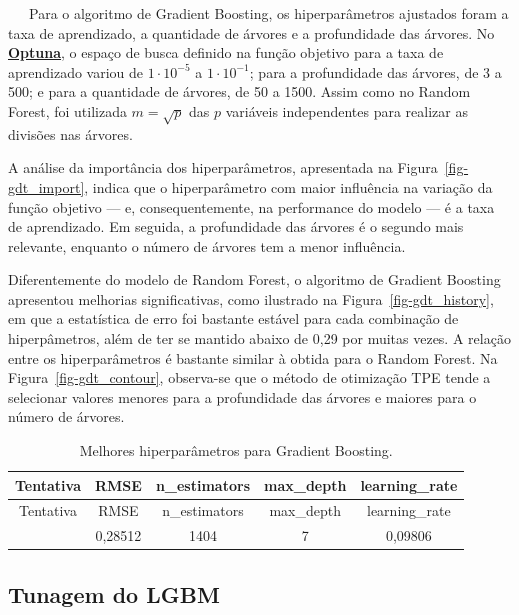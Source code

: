 \documentclass[
  12pt,
  a4paper,
]{scrreprt}
\begin{document}
~~~Para o algoritmo de Gradient Boosting, os hiperparâmetros ajustados
foram a taxa de aprendizado, a quantidade de árvores e a profundidade
das árvores. No \href{https://optuna.org/}{\textbf{Optuna}}, o espaço de
busca definido na função objetivo para a taxa de aprendizado variou de
\(1 \cdot 10^{-5}\) a \(1 \cdot 10^{-1}\); para a profundidade das
árvores, de 3 a 500; e para a quantidade de árvores, de 50 a 1500. Assim
como no Random Forest, foi utilizada \(m = \sqrt{p}\)\hspace{0pt} das
\(p\) variáveis independentes para realizar as divisões nas árvores.

\vspace{12pt}

A análise da importância dos hiperparâmetros, apresentada na
Figura~\ref{fig-gdt_import}, indica que o hiperparâmetro com maior
influência na variação da função objetivo --- e, consequentemente, na
performance do modelo --- é a taxa de aprendizado. Em seguida, a
profundidade das árvores é o segundo mais relevante, enquanto o número
de árvores tem a menor influência.

\vspace{12pt}

Diferentemente do modelo de Random Forest, o algoritmo de Gradient
Boosting apresentou melhorias significativas, como ilustrado na
Figura~\ref{fig-gdt_history}, em que a estatística de erro foi bastante
estável para cada combinação de hiperpâmetros, além de ter se mantido
abaixo de 0,29 por muitas vezes. A relação entre os hiperparâmetros é
bastante similar à obtida para o Random Forest. Na
Figura~\ref{fig-gdt_contour}, observa-se que o método de otimização TPE
tende a selecionar valores menores para a profundidade das árvores e
maiores para o número de árvores.

\begin{longtable}[]{@{}ccccc@{}}
\caption{Melhores hiperparâmetros para Gradient
Boosting.}\label{tbl-params_gdt}\tabularnewline
\toprule\noalign{}
Tentativa & RMSE & n\_estimators & max\_depth & learning\_rate \\
\midrule\noalign{}
\endfirsthead
\toprule\noalign{}
Tentativa & RMSE & n\_estimators & max\_depth & learning\_rate \\
\midrule\noalign{}
\endhead
\bottomrule\noalign{}
\endlastfoot
57 & 0,28512 & 1404 & 7 & 0,09806 \\
\end{longtable}

\subsection{Tunagem do LGBM}\label{tunagem-do-lgbm}
\end{document}
